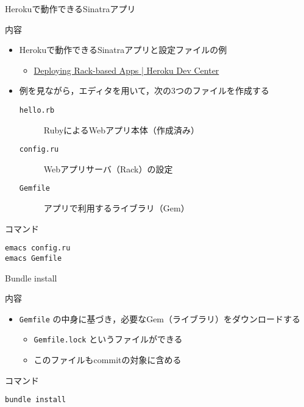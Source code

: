 \documentclass[t, aspectratio=169]{beamer}
\begin{document}
\begin{frame}[fragile,label=sec-5-2-3]{Herokuで動作できるSinatraアプリ}
 \begin{block}{内容}
\begin{itemize}
\item Herokuで動作できるSinatraアプリと設定ファイルの例
\begin{itemize}
\item \href{https://devcenter.heroku.com/articles/rack#sinatra}{Deploying Rack-based Apps | Heroku Dev Center}
\end{itemize}
\item 例を見ながら，エディタを用いて，次の3つのファイルを作成する
\begin{description}
\item[{\texttt{hello.rb}}] RubyによるWebアプリ本体（作成済み）
\item[{\texttt{config.ru}}] Webアプリサーバ（Rack）の設定
\item[{\texttt{Gemfile}}] アプリで利用するライブラリ（Gem）
\end{description}
\end{itemize}
\end{block}

\begin{block}{コマンド}
\begin{verbatim}
emacs config.ru
emacs Gemfile
\end{verbatim}
\end{block}
\end{frame}
\begin{frame}[fragile,label=sec-5-2-4]{Bundle install}
 \begin{block}{内容}
\begin{itemize}
\item \texttt{Gemfile} の中身に基づき，必要なGem（ライブラリ）をダウンロードする
\begin{itemize}
\item \texttt{Gemfile.lock} というファイルができる
\item このファイルもcommitの対象に含める
\end{itemize}
\end{itemize}
\end{block}

\begin{block}{コマンド}
\begin{verbatim}
bundle install
\end{verbatim}
\end{block}
\end{frame}
\end{document}
